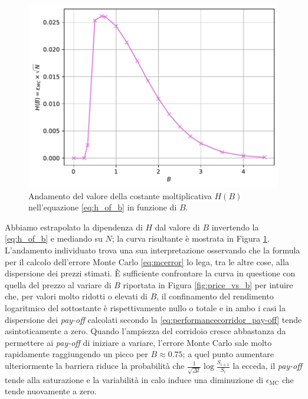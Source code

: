 \begin{figure}[t]
    \centering
    \includegraphics[scale=0.5]{graphs/OptionPriceVsB_HBVsB.pdf}
    \caption[Andamento del valore della costante moltiplicativa $H(B)$ nell'equazione in funzione di $B$.]{Andamento del valore della costante moltiplicativa $H(B)$ nell'equazione \eqref{eq:h_of_b} in funzione di $B$.}
    \label{fig:HB_vs_B}
\end{figure}

Abbiamo estrapolato la dipendenza di $H$ dal valore di $B$ invertendo la \eqref{eq:h_of_b} e mediando su $N$; la curva risultante è mostrata in Figura \ref{fig:HB_vs_B}. L'andamento individuato trova una sua interpretazione osservando che la formula per il calcolo dell'errore Monte Carlo \eqref{eq:mcerror} lo lega, tra le altre cose, alla dispersione dei prezzi stimati. È sufficiente confrontare la curva in questione con quella del prezzo al variare di $B$ riportata in Figura \ref{fig:price_vs_b} per intuire che, per valori molto ridotti o elevati di $B$, il confinamento del rendimento logaritmico del sottostante è rispettivamente nullo o totale e in ambo i casi la dispersione dei \textit{pay-off} calcolati secondo la \eqref{eq:performancecorridor_pay-off} tende asintoticamente a zero. Quando l'ampiezza del corridoio cresce abbastanza da permettere ai \textit{pay-off} di iniziare a variare, l'errore Monte Carlo sale molto rapidamente raggiungendo un picco per $B\approx 0.75$; a quel punto aumentare ulteriormente la barriera riduce la probabilità che $\frac{1}{\sqrt{\Delta t}}\log{\frac{S_{i+1}}{S_i}}$ la ecceda, il \textit{pay-off} tende alla saturazione e la variabilità in calo induce una diminuzione di $\epsilon_\text{MC}$ che tende nuovamente a zero.

